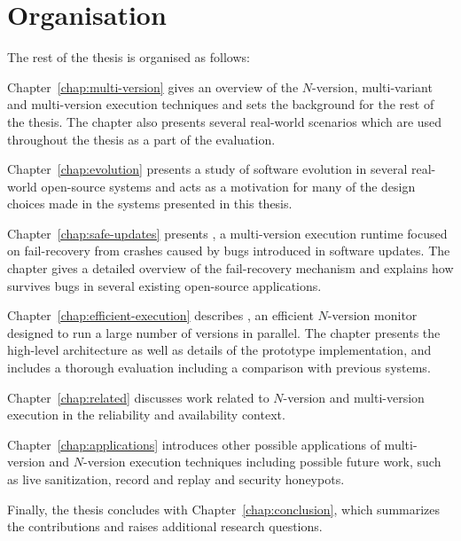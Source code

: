 \section{Organisation}
\label{overview:organisation}

The rest of the thesis is organised as follows:

\begin{chapterdescription}
\item[Chapter~\ref{chap:multi-version}] gives an overview of the $N$-version,
  multi-variant and multi-version execution techniques and sets the background
  for the rest of the thesis. The chapter also presents several real-world
  scenarios which are used throughout the thesis as a part of the evaluation.

\item[Chapter~\ref{chap:evolution}] presents a study of software evolution in
  several real-world open-source systems and acts as a motivation for many of
  the design choices made in the systems presented in this thesis.

\item[Chapter~\ref{chap:safe-updates}] presents \mx, a multi-version execution
  runtime focused on fail-recovery from crashes caused by bugs introduced in
  software updates. The chapter gives a detailed overview of the fail-recovery
  mechanism and explains how \mx survives bugs in several existing open-source
  applications.

\item[Chapter~\ref{chap:efficient-execution}] describes \varan, an efficient
  $N$-version monitor designed to run a large number of versions in parallel.
  The chapter presents the high-level architecture as well as details of the
  prototype implementation, and includes a thorough evaluation including a
  comparison with previous systems.

\item[Chapter~\ref{chap:related}] discusses work related to $N$-version and
  multi-version execution in the reliability and availability context.

\item[Chapter~\ref{chap:applications}] introduces other possible applications
  of multi-version and $N$-version execution techniques including possible
  future work, such as live sanitization, record and replay and security
  honeypots.
\end{chapterdescription}

Finally, the thesis concludes with Chapter~\ref{chap:conclusion}, which
summarizes the contributions and raises additional research questions.


